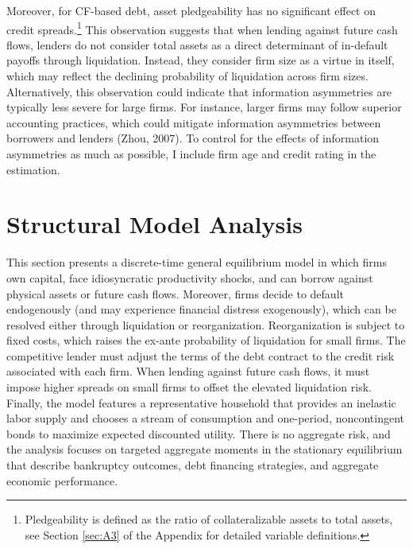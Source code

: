 \documentclass[12pt]{article}
\begin{document}
Moreover, for CF-based debt, asset pledgeability has no significant effect on credit spreads.\footnote{Pledgeability is defined as the ratio of collateralizable assets to total assets, see Section \ref{sec:A3} of the Appendix for detailed variable definitions.}  This observation suggests that when lending against future cash flows, lenders do not consider total assets as a direct determinant of in-default payoffs through liquidation. Instead, they consider firm size as a virtue in itself, which may reflect the declining probability of liquidation across firm sizes. Alternatively, this observation could indicate that information asymmetries are typically less severe for large firms. For instance, larger firms may follow superior accounting practices, which could mitigate information asymmetries between borrowers and lenders (Zhou, 2007). To control for the effects of information asymmetries as much as possible, I include firm age and credit rating in the estimation.

\section{Structural Model Analysis} \label{sec:model}
This section presents a discrete-time general equilibrium model in which firms own capital, face idiosyncratic productivity shocks, and can borrow against physical assets or future cash flows. Moreover, firms decide to default endogenously (and may experience financial distress exogenously), which can be resolved either through liquidation or reorganization. Reorganization is subject to fixed costs, which raises the ex-ante probability of liquidation for small firms. The competitive lender must adjust the terms of the debt contract to the credit risk associated with each firm. When lending against future cash flows, it must impose higher spreads on small firms to offset the elevated liquidation risk. Finally, the model features a representative household that provides an inelastic labor supply and chooses a stream of consumption and one-period, noncontingent bonds to maximize expected discounted utility. There is no aggregate risk, and the analysis focuses on targeted aggregate moments in the stationary equilibrium that describe bankruptcy outcomes, debt financing strategies, and aggregate economic performance.
\end{document}
